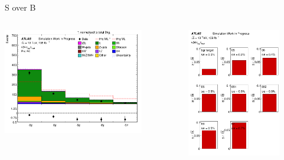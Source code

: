 \begin{frame}{S over B}
    \begin{columns}
        \begin{column}{0.5\textwidth}
            \includegraphics[width=0.8\textwidth]{Summary}
        \end{column}
        \begin{column}{0.5\textwidth}
            \includegraphics[width=0.8\textwidth]{soverb}
        \end{column}
    \end{columns}
\end{frame}

